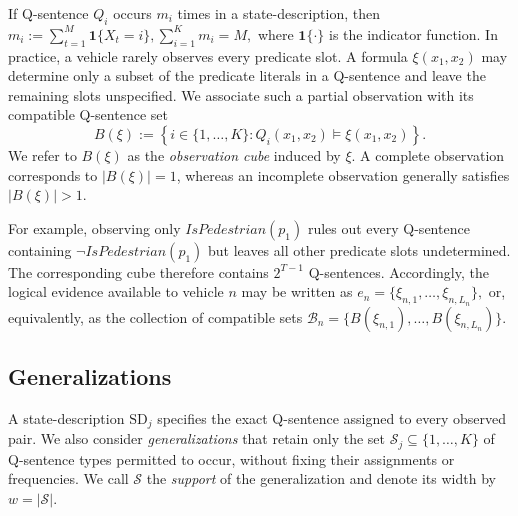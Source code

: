\documentclass[10pt, conference, letterpaper]{ IEEEtran}
\theoremstyle{bfnote}
\begin{document}
If Q-sentence $Q_i$ occurs
$m_i$ times in a state-description, then
$
    m_i
    :=
    \sum_{t=1}^{M}\mathbf{1}\{X_t=i\},
    \sum_{i=1}^{K}m_i=M,
$
where $\mathbf{1}\{\cdot\}$ is the indicator function.
In practice, a vehicle rarely observes every predicate slot. A formula
$\xi(x_1,x_2)$ may determine only a subset of the predicate literals in a Q-sentence
and leave the remaining slots unspecified. We associate such a partial
observation with its compatible Q-sentence set
\begin{equation}
\label{eq:observation-cube}
    B(\xi)
    :=
    \left\{
        i\in\{1,\ldots,K\}:
        Q_i(x_1,x_2)\models\xi(x_1,x_2)
    \right\}.
\end{equation}
We refer to $B(\xi)$ as the \emph{observation cube} induced by $\xi$. A
complete observation corresponds to $|B(\xi)|=1$, whereas an incomplete
observation generally satisfies $|B(\xi)|>1$.

For example, observing only
$\mathit{IsPedestrian}(p_1)$ rules out every Q-sentence containing
$\neg\mathit{IsPedestrian}(p_1)$ but leaves all other predicate slots
undetermined. The corresponding cube therefore contains
$2^{T-1}$ Q-sentences. Accordingly, the logical evidence available to vehicle $n$ may be written as
$
    e_n
    =
    \{\xi_{n,1},\ldots,\xi_{n,L_n}\},
$
or, equivalently, as the collection of compatible sets
$
    \mathcal{B}_n
    =
    \{B(\xi_{n,1}),\ldots,B(\xi_{n,L_n})\}.
$

\subsection{Generalizations}

A state-description $\mathrm{SD}_j$ specifies the exact Q-sentence assigned
to every observed pair. We also consider \emph{generalizations} that retain
only the set
$\mathcal{S}_j\subseteq\{1,\ldots,K\}$
of Q-sentence types permitted to occur, without fixing their assignments or
frequencies. We call $\mathcal{S}$ the \emph{support} of the generalization
and denote its width by $w=|\mathcal{S}|$. 
\end{document}
